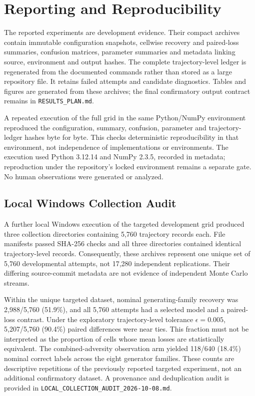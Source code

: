 \section{Reporting and Reproducibility}

The reported experiments are development evidence. Their compact archives contain immutable configuration snapshots, cellwise recovery and paired-loss summaries, confusion matrices, parameter summaries and metadata linking source, environment and output hashes. The complete trajectory-level ledger is regenerated from the documented commands rather than stored as a large repository file. It retains failed attempts and candidate diagnostics. Tables and figures are generated from these archives; the final confirmatory output contract remains in \texttt{RESULTS\_PLAN.md}.

A repeated execution of the full grid in the same Python/NumPy environment reproduced the configuration, summary, confusion, parameter and trajectory-ledger hashes byte for byte. This checks deterministic reproducibility in that environment, not independence of implementations or environments. The execution used Python 3.12.14 and NumPy 2.3.5, recorded in metadata; reproduction under the repository's locked environment remains a separate gate. No human observations were generated or analyzed.


\subsection{Local Windows Collection Audit}

A further local Windows execution of the targeted development grid produced
three collection directories containing 5,760 trajectory records each. File
manifests passed SHA-256 checks and all three directories contained
identical trajectory-level records. Consequently, these archives represent
one unique set of 5,760 developmental attempts, not 17,280 independent
replications. Their differing source-commit metadata are not evidence of
independent Monte Carlo streams.

Within the unique targeted dataset, nominal generating-family recovery was
2,988/5,760 (51.9\%), and all 5,760 attempts had a selected model and a
paired-loss contrast. Under the exploratory trajectory-level tolerance
$\epsilon=0.005$, 5,207/5,760 (90.4\%) paired differences were near ties.
This fraction must not be interpreted as the proportion of cells whose mean
losses are statistically equivalent. The combined-adversity observation arm
yielded 118/640 (18.4\%) nominal correct labels across the eight generator
families. These counts are descriptive repetitions of the previously
reported targeted experiment, not an additional confirmatory dataset.
A provenance and deduplication audit is provided in
\texttt{LOCAL\_COLLECTION\_AUDIT\_2026-10-08.md}.
